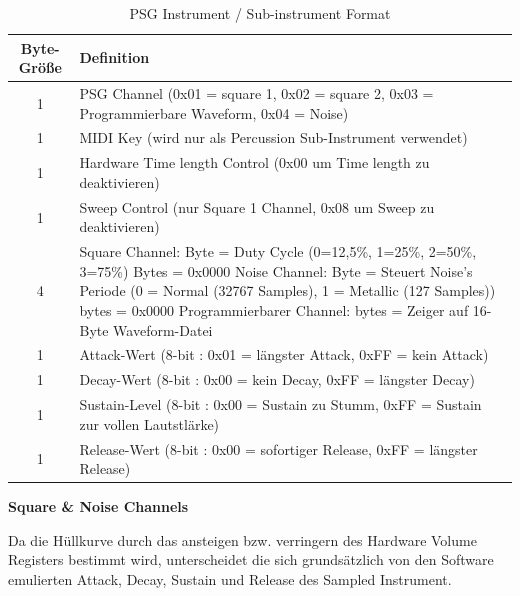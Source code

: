 \documentclass[11pt,a4paper]{scrartcl}
\newcommand{\paratitle}[1] {
    \vspace{5mm}
    \large \textbf{#1} \normalsize
    \vspace{2mm}\newline
}
\begin{document}
\begin{table}[h]
    \centering
    \begin{tabular}{ c | p{15cm} }
        \textbf{Byte-Gr\"o{\ss}e} & \textbf{Definition} \\
				\hline
				1 & PSG Channel (0x01 = square 1, 0x02 = square 2, 0x03 = Programmierbare Waveform, 0x04 = Noise) \\
				\hline
        1 & MIDI Key (wird nur als Percussion Sub-Instrument verwendet)\\
				\hline
        1 & Hardware Time length Control (0x00 um Time length zu deaktivieren)\\
				\hline
        1 & Sweep Control (nur Square 1 Channel, 0x08 um Sweep zu deaktivieren) \\
				\hline
        4 & Square Channel:\newline
					1 Byte = Duty Cycle (0=12,5\%, 1=25\%, 2=50\%, 3=75\%)\newline
					3 Bytes = 0x0000\newline		
					Noise Channel:\newline	
					1 Byte = Steuert Noise's Periode (0 = Normal (32767 Samples), 1 = Metallic (127 Samples)) \newline
					3 bytes = 0x0000
					\newline
					Programmierbarer Channel:\newline
                4 bytes = Zeiger auf 16-Byte Waveform-Datei \\
				\hline
        1 & Attack-Wert (8-bit : 0x01 = l\"angster Attack, 0xFF = kein Attack)\\
				\hline
        1 & Decay-Wert (8-bit : 0x00 = kein Decay, 0xFF = l\"angster Decay) \\
				\hline
        1 & Sustain-Level (8-bit : 0x00 = Sustain zu Stumm, 0xFF = Sustain zur vollen Lautstl\"arke) \\
				\hline
        1 & Release-Wert (8-bit : 0x00 = sofortiger Release, 0xFF = l\"angster Release) \\
				
    \end{tabular}
    \caption{PSG Instrument / Sub-instrument Format}
    \label{table:PSGInstrument}
\end{table}
\vspace{-5pt}

\paratitle{Square \& Noise Channels}
Da die H\"ullkurve durch das ansteigen bzw. verringern des Hardware Volume Registers bestimmt wird, unterscheidet die sich grunds\"atzlich von den  Software emulierten Attack, Decay, Sustain und Release des Sampled Instrument.
\end{document}
